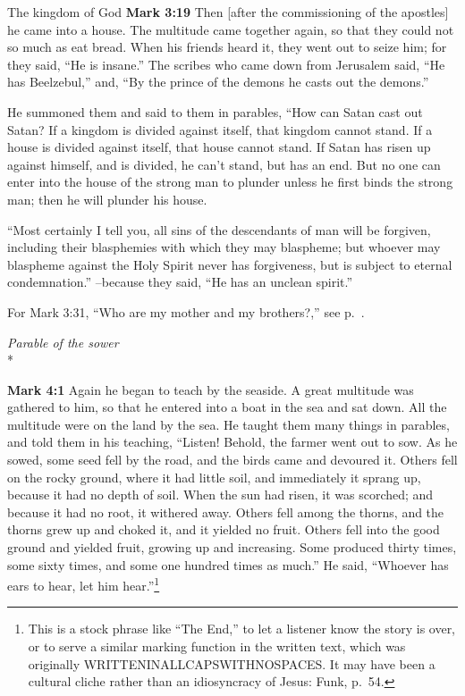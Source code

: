 \documentclass[10pt,twoside]{article} %
\newcommand{\doimage}[2]{\texttt{[image: \#2]}\label{fig:#2}}
\newcommand{\figbasic}[4]{ %
    \ifthenelse{\isodd{\pageref{fig:#2}}}{}{\hfill}
    \ifstrempty{#3}{
      \doimage{#1}{#2}
    }{
      \makebox{\doimage{#1}{#2} \\ #3}
    }
    \ifthenelse{\isodd{\pageref{fig:#2}}}{\hfill}{}
    \par
}
\newcommand{\fig}[2][0.4]{
  \figbasic{#1}{#2}{}{}
}
\newcommand{\quotesize}{\normalsize{}}
\newcommand{\comm}[1]{\begingroup \color{black!50} #1\endgroup}
\newenvironment{quotetext}{\begingroup\quotesize}{\endgroup}
\newcommand{\intex}[1]{\index[texts]{#1}}
\newcommand{\bible}[2]{\begin{quotetext}\textbf{#1}\intex{#1} #2\end{quotetext}}
\newcommand{\gospelmark}[2]{\bible{Mark #1}{#2}}
\newcommand{\subhead}[1]{\emph{#1}\\*}
\begin{document}
\begin{section}{The kingdom of God}
\gospelmark{3:19}{
Then [after the commissioning of the apostles] he came into a house.   The multitude came together again, so that they could not so much as eat bread.   When his friends heard it, they went out to seize him; for they said, ``He is insane.''   The scribes who came down from Jerusalem said, ``He has Beelzebul,'' and, ``By the prince of the demons he casts out the demons.''

  He summoned them and said to them in parables, ``How can Satan cast out Satan?    If a kingdom is divided against itself, that kingdom cannot stand.    If a house is divided against itself, that house cannot stand.    If Satan has risen up against himself, and is divided, he can't stand, but has an end.    But no one can enter into the house of the strong man to plunder unless he first binds the strong man; then he will plunder his house.

   ``Most certainly I tell you, all sins of the descendants of man will be forgiven, including their blasphemies with which they may blaspheme;    but whoever may blaspheme against the Holy Spirit never has forgiveness, but is subject to eternal condemnation.''   --because they said, ``He has an unclean spirit.''\label{how-can-satan}
}

\comm{For Mark 3:31, ``Who are my mother and my brothers?,'' see p.~\pageref{who-are-my-mother-and-my-brothers}.}

\fig{sower}

\subhead{Parable of the sower}

\gospelmark{4:1}{
   Again he began to teach by the seaside. A great multitude was gathered to him, so that he entered into a boat in the sea and sat down. All the multitude were on the land by the sea.   He taught them many things in parables, and told them in his teaching,    ``Listen! Behold, the farmer went out to sow.    As he sowed, some seed fell by the road, and the birds came and devoured it.    Others fell on the rocky ground, where it had little soil, and immediately it sprang up, because it had no depth of soil.    When the sun had risen, it was scorched; and because it had no root, it withered away.    Others fell among the thorns, and the thorns grew up and choked it, and it yielded no fruit.    Others fell into the good ground and yielded fruit, growing up and increasing. Some produced thirty times, some sixty times, and some one hundred times as much.''   
He said, ``Whoever has ears to hear, let him hear.''\footnote{This is a stock phrase like ``The End,'' to let a listener know the story
is over, or to serve a similar marking function in the written text, which was originally WRITTENINALLCAPSWITHNOSPACES. It may have been
a cultural cliche rather than an idiosyncracy of Jesus: Funk, p.~54.}

}
\end{section}
\end{document}

